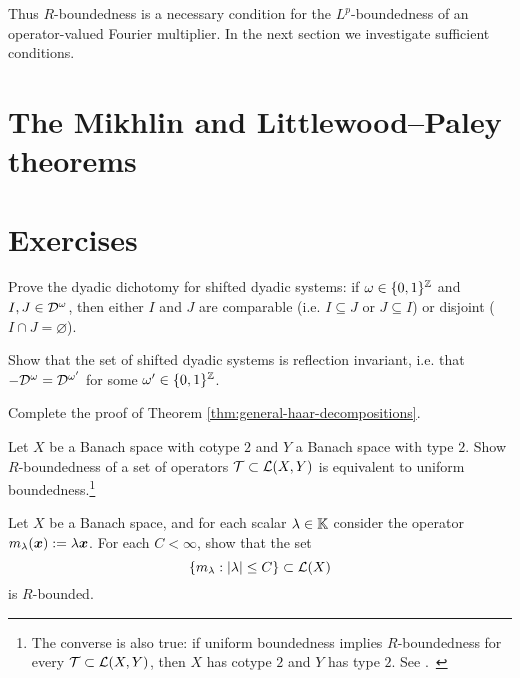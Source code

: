 {\begin{example}
Thus $R$-boundedness is a necessary condition for the $L^p$-boundedness of an operator-valued Fourier multiplier.
In the next section we investigate sufficient conditions.

\section{The Mikhlin and Littlewood--Paley  theorems}



\section{Exercises}

\begin{exercise}\label{ex:dyadic-dichotomy}
  Prove the dyadic dichotomy for shifted dyadic systems: if $\omega \in \{0,1\}^{\mathbb{Z}}$ and $I,J \in \mathcal{D}^{\omega}$, then either $I$ and $J$ are comparable (i.e. $I \subseteq J$ or $J \subseteq I$) or disjoint ($I \cap J = \varnothing$).
\end{exercise}

\begin{exercise}\label{ex:dyadic-refln-invariance}
  Show that the set of shifted dyadic systems is reflection invariant, i.e. that $-\mathcal{D}^{\omega} = \mathcal{D}^{\omega'}$ for some $\omega' \in \{0,1\}^{\mathbb{Z}}$.
\end{exercise}

\begin{exercise}\label{ex:mgale-reduction}
  Complete the proof of Theorem \ref{thm:general-haar-decompositions}.
\end{exercise}


\begin{exercise}\label{ex:R-bound-type}
  Let $X$ be a Banach space with cotype $2$ and $Y$ a Banach space with type $2$.
  Show $R$-boundedness of a set of operators $\mathcal{T} \subset \mathcal{L}(X,Y)$ is equivalent to uniform boundedness.\footnote{The converse is also true: if uniform boundedness implies $R$-boundedness for every $\mathcal{T} \subset \mathcal{L}(X,Y)$, then $X$ has cotype $2$ and $Y$ has type $2$. See \cite[Proposition 8.6.1]{HNVW17}.\ }
\end{exercise}

\begin{exercise}
  Let $X$ be a Banach space, and for each scalar $\lambda \in \mathbb{K}$ consider the operator $m_{\lambda}(\bm{x}) := \lambda \bm{x}$.
  For each $C < \infty$, show that the set
  \begin{equation*}
    \{m_{\lambda} : |\lambda| \leq C\} \subset \mathcal{L}(X)
  \end{equation*}
  is $R$-bounded.
\end{exercise}


\end{example}}
